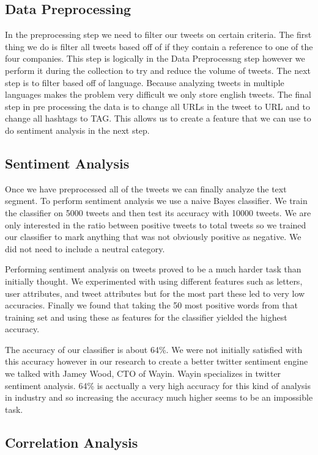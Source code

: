 \documentclass{acm_proc_article-sp}
\begin{document}
\subsection{Data Preprocessing}

In the preprocessing step we need to filter our tweets on certain criteria. The
first thing we do is filter all tweets based off of if they contain a reference
to one of the four companies. This step is logically in the Data Preprocessng
step however we perform it during the collection to try and reduce the volume
of tweets.  The next step is to filter based off of language. Because analyzing
tweets in multiple languages makes the problem very difficult we only store
english tweets. The final step in pre processing the data is to change all URLs
in the tweet to URL and to change all hashtags to TAG. This allows us to create
a feature that we can use to do sentiment analysis in the next step.

\subsection{Sentiment Analysis}

Once we have preprocessed all of the tweets we can finally analyze the text
segment. To perform sentiment analysis we use a naive Bayes classifier. We
train the classifier on 5000 tweets and then test its accuracy with 10000
tweets.  We are only interested in the ratio between positive tweets to total
tweets so we trained our classifier to mark anything that was not obviously
positive as negative. We did not need to include a neutral category. 

Performing sentiment analysis on tweets proved to be a much harder task than
initially thought. We experimented with using different features such as
letters, user attributes, and tweet attributes but for the most part these led
to very low accuracies. Finally we found that taking the 50 most positive words
from that training set and using these as features for the classifier yielded
the highest accuracy. 

The accuracy of our classifier is about 64\%. We were
not initially satisfied with this accuracy however in our research to create a
better twitter sentiment engine we talked with Jamey Wood, CTO of Wayin. Wayin
specializes in twitter sentiment analysis. 64\% is acctually a very high
accuracy for this kind of analysis in industry and so increasing the accuracy
much higher seems to be an impossible task.

\subsection{Correlation Analysis}
\end{document}
